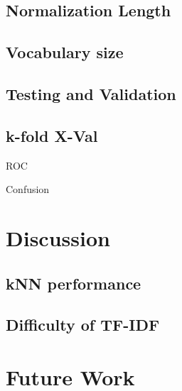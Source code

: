 \documentclass[10pt,twocolumn]{article}
\begin{document}
\subsection*{Normalization Length}

\subsection*{Vocabulary size}

\subsection*{Testing and Validation}

\subsection*{k-fold X-Val}

ROC

Confusion
 
\section*{Discussion}

\subsection*{kNN performance}

\subsection*{Difficulty of TF-IDF}

\section*{Future Work}
\end{document}
